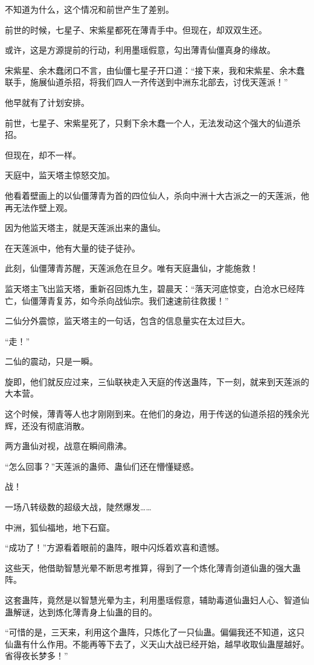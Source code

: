 \begin{this_body}
不知道为什么，这个情况和前世产生了差别。

前世的时候，七星子、宋紫星都死在薄青手中。但现在，却双双生还。

或许，这是方源提前的行动，利用墨瑶假意，勾出薄青仙僵真身的缘故。

宋紫星、余木蠢闭口不言，由仙僵七星子开口道：“接下来，我和宋紫星、余木蠢联手，施展仙道杀招，将我们四人一齐传送到中洲东北部去，讨伐天莲派！”

他早就有了计划安排。

前世，七星子、宋紫星死了，只剩下余木蠢一个人，无法发动这个强大的仙道杀招。

但现在，却不一样。

天庭中，监天塔主惊怒交加。

他看着壁画上的以仙僵薄青为首的四位仙人，杀向中洲十大古派之一的天莲派，他再无法作壁上观。

因为他监天塔主，就是天莲派出来的蛊仙。

在天莲派中，他有大量的徒子徒孙。

此刻，仙僵薄青苏醒，天莲派危在旦夕。唯有天庭蛊仙，才能施救！

监天塔主飞出监天塔，重新召回炼九生，碧晨天：“落天河底惊变，白沧水已经阵亡，仙僵薄青复苏，如今杀向战仙宗。我们速速前往救援！”

二仙分外震惊，监天塔主的一句话，包含的信息量实在太过巨大。

“走！”

二仙的震动，只是一瞬。

旋即，他们就反应过来，三仙联袂走入天庭的传送蛊阵，下一刻，就来到天莲派的大本营。

这个时候，薄青等人也才刚刚到来。在他们的身边，用于传送的仙道杀招的残余光辉，还没有彻底消散。

两方蛊仙对视，战意在瞬间鼎沸。

“怎么回事？”天莲派的蛊师、蛊仙们还在懵懂疑惑。

战！

一场八转级数的超级大战，陡然爆发……

中洲，狐仙福地，地下石窟。

“成功了！”方源看着眼前的蛊阵，眼中闪烁着欢喜和遗憾。

这些天，他借助智慧光晕不断思考推算，得到了一个炼化薄青剑道仙蛊的强大蛊阵。

这套蛊阵，竟然是以智慧光晕为主，利用墨瑶假意，辅助毒道仙蛊妇人心、智道仙蛊解谜，达到炼化薄青身上仙蛊的目的。

“可惜的是，三天来，利用这个蛊阵，只炼化了一只仙蛊。偏偏我还不知道，这只仙蛊有什么作用。不能再等下去了，义天山大战已经开始，越早收取仙蛊屋越好。省得夜长梦多！”

\end{this_body}

